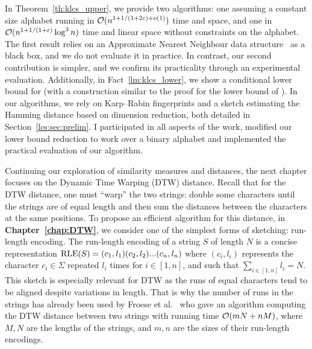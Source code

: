 In Theorem~\ref{th:klcs_upper}, we provide two algorithms: one assuming a constant size alphabet running in $\mathcal{O}(n^{1+ 1/(1+2\varepsilon) + o(1)})$ time and space, and one in $\mathcal{O}(n^{1+1/(1+\varepsilon)} \log^3 n)$ time and linear space without constraints on the alphabet. The first result relies on an Approximate Nearest Neighbour data structure~\cite{DBLP:conf/stoc/AndoniR15} as a black box, and we do not evaluate it in practice. In contrast, our second contribution is simpler, and we confirm its practicality through an experimental evaluation.
Additionally, in Fact~\ref{lm:klcs_lower}, we show a conditional lower bound for \kApproxLCS (with a construction similar to the proof for the lower bound of \kLCS ).
In our algorithms, we rely on Karp--Rabin fingerprints and a sketch estimating the Hamming distance based on dimension reduction, both detailed in Section~\ref{lcs:sec:prelim}.
I participated in all aspects of the work, modified our lower bound reduction to work over a binary alphabet and implemented the practical evaluation of our algorithm.


Continuing our exploration of similarity measures and distances, the next chapter focuses on the Dynamic Time Warping (DTW) distance. Recall that for the DTW distance, one must ``warp'' the two strings: double some characters until the strings are of equal length and then sum the distances between the characters at the same positions.
To propose an efficient algorithm for this distance, in \textbf{Chapter~\ref{chap:DTW}}, we consider one of the simplest forms of sketching: run-length encoding. The run-length encoding of a string $S$ of length $N$ is a concise representation $\mathrm{RLE}(S)=(c_1,l_1)(c_2,l_2)...(c_n,l_n)$ where $(c_i,l_i)$ represents the character $c_i \in \Sigma$ repeated $l_i$ times for $i \in [1,n]$, and such that $\sum_{i\in [1,n]} l_i = N$.
This sketch is especially relevant for DTW as the runs of equal characters tend to be aligned despite variations in length. That is why the number of runs in the strings has already been used by Froese et al.~\cite{DBLP:journals/corr/abs-1903-03003} who gave an algorithm computing the DTW distance between two strings with running time $\mathcal{O}(mN+nM)$, where $M,N$ are the lengths of the strings, and $m, n$ are the sizes of their run-length encodings.

